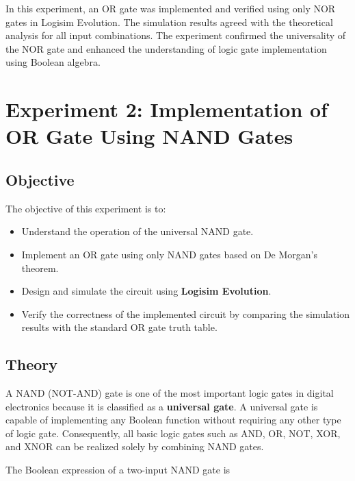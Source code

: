 \documentclass[12pt,a4paper]{article}
\begin{document}
In this experiment, an OR gate was implemented and verified using only NOR gates in Logisim Evolution. The simulation results agreed with the theoretical analysis for all input combinations. The experiment confirmed the universality of the NOR gate and enhanced the understanding of logic gate implementation using Boolean algebra.



\section{Experiment 2: Implementation of OR Gate Using NAND Gates}

\subsection{Objective}

The objective of this experiment is to:

\begin{itemize}
    \item Understand the operation of the universal NAND gate.
    \item Implement an OR gate using only NAND gates based on De Morgan's theorem.
    \item Design and simulate the circuit using \textbf{Logisim Evolution}.
    \item Verify the correctness of the implemented circuit by comparing the simulation results with the standard OR gate truth table.
\end{itemize}

\subsection{Theory}

A NAND (NOT-AND) gate is one of the most important logic gates in digital electronics because it is classified as a \textbf{universal gate}. A universal gate is capable of implementing any Boolean function without requiring any other type of logic gate. Consequently, all basic logic gates such as AND, OR, NOT, XOR, and XNOR can be realized solely by combining NAND gates.

The Boolean expression of a two-input NAND gate is
\end{document}
